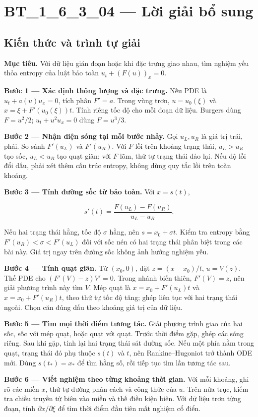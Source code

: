 \documentclass[10pt,a4paper]{article}
\begin{document}
\section*{BT\_1\_6\_3\_04 — Lời giải bổ sung}
\subsection*{Kiến thức và trình tự giải}
\textbf{Mục tiêu.} Với dữ liệu gián đoạn hoặc khi đặc trưng giao nhau, tìm nghiệm yếu thỏa entropy của luật bảo toàn $u_t+(F(u))_x=0$.

\textbf{Bước 1 — Xác định thông lượng và đặc trưng.} Nếu PDE là $u_t+a(u)u_x=0$, tích phân $F'=a$. Trong vùng trơn, $u=u_0(\xi)$ và $x=\xi+F'(u_0(\xi))t$. Tính riêng tốc độ cho mỗi đoạn dữ liệu. Burgers dùng $F=u^2/2$; $u_t+u^2u_x=0$ dùng $F=u^3/3$.

\textbf{Bước 2 — Nhận diện sóng tại mỗi bước nhảy.} Gọi $u_L,u_R$ là giá trị trái, phải. So sánh $F'(u_L)$ và $F'(u_R)$. Với $F$ lồi trên khoảng trạng thái, $u_L>u_R$ tạo sốc, $u_L<u_R$ tạo quạt giãn; với $F$ lõm, thứ tự trạng thái đảo lại. Nếu độ lồi đổi dấu, phải xét thêm cấu trúc entropy, không dùng quy tắc lồi trên toàn khoảng.

\textbf{Bước 3 — Tính đường sốc từ bảo toàn.} Với $x=s(t)$,

\[
s'(t)=\frac{F(u_L)-F(u_R)}{u_L-u_R}.
\]

Nếu hai trạng thái hằng, tốc độ $\sigma$ hằng, nên $s=x_0+\sigma t$. Kiểm tra entropy bằng $F'(u_R)<\sigma<F'(u_L)$ đối với sốc nén có hai trạng thái phân biệt trong các bài này. Giá trị ngay trên đường sốc không ảnh hưởng nghiệm yếu.

\textbf{Bước 4 — Tính quạt giãn.} Từ $(x_0,0)$, đặt $z=(x-x_0)/t$, $u=V(z)$. Thế PDE cho $(F'(V)-z)V'=0$. Trong nhánh biến thiên, $F'(V)=z$, nên giải phương trình này tìm $V$. Mép quạt là $x=x_0+F'(u_L)t$ và $x=x_0+F'(u_R)t$, theo thứ tự tốc độ tăng; ghép liên tục với hai trạng thái ngoài. Chọn căn đúng dấu theo khoảng giá trị của dữ liệu.

\textbf{Bước 5 — Tìm mọi thời điểm tương tác.} Giải phương trình giao của hai sốc, sốc với mép quạt, hoặc quạt với quạt. Trước thời điểm gặp, ghép các sóng riêng. Sau khi gặp, tính lại hai trạng thái sát đường sốc. Nếu một phía nằm trong quạt, trạng thái đó phụ thuộc $s(t)$ và $t$, nên Rankine–Hugoniot trở thành ODE mới. Dùng $s(t_*)=x_*$ để tìm hằng số, rồi tiếp tục tìm lần tương tác sau.

\textbf{Bước 6 — Viết nghiệm theo từng khoảng thời gian.} Với mỗi khoảng, ghi rõ các miền $x$, thứ tự đường phân cách và công thức của $u$. Trên nửa trục, kiểm tra chiều truyền từ biên vào miền và thế điều kiện biên. Với dữ liệu trơn từng đoạn, tính $\partial x/\partial\xi$ để tìm thời điểm đầu tiên mất nghiệm cổ điển.
\end{document}
